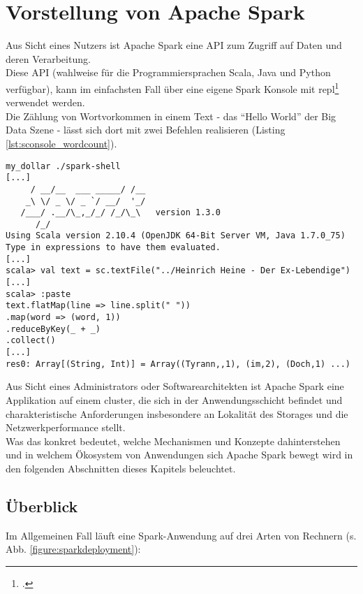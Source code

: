 \chapter{Vorstellung von Apache Spark}
Aus Sicht eines Nutzers ist Apache Spark eine API zum Zugriff auf Daten und deren Verarbeitung.\\

Diese API (wahlweise für die Programmiersprachen Scala, Java und Python verfügbar), kann im einfachsten Fall über eine eigene Spark Konsole mit \gls{repl}\footcite{Hail} verwendet werden.\\
Die Zählung von Wortvorkommen in einem Text - das "`Hello World"' der Big Data Szene - lässt sich dort mit zwei Befehlen realisieren (Listing \ref{lst:sconsole_wordcount}).\\

\begin{lstlisting}[caption={Word Count in der Spark Konsole},label={lst:sconsole_wordcount}]
my_dollar ./spark-shell
[...]
     / __/__  ___ _____/ /__
    _\ \/ _ \/ _ `/ __/  '_/
   /___/ .__/\_,_/_/ /_/\_\   version 1.3.0
      /_/
Using Scala version 2.10.4 (OpenJDK 64-Bit Server VM, Java 1.7.0_75)
Type in expressions to have them evaluated.
[...]
scala> val text = sc.textFile("../Heinrich Heine - Der Ex-Lebendige")
[...]
scala> :paste
text.flatMap(line => line.split(" "))
.map(word => (word, 1))
.reduceByKey(_ + _)
.collect()
[...]
res0: Array[(String, Int)] = Array((Tyrann,,1), (im,2), (Doch,1) ...)
\end{lstlisting}


Aus Sicht eines Administrators oder Softwarearchitekten ist Apache Spark eine Applikation auf einem \gls{cluster}, die sich in der Anwendungsschicht befindet und charakteristische Anforderungen insbesondere an Lokalität des Storages und die Netzwerkperformance stellt.\\

Was das konkret bedeutet, welche Mechanismen und Konzepte dahinterstehen und in welchem Ökosystem von Anwendungen sich Apache Spark bewegt wird in den folgenden Abschnitten dieses Kapitels beleuchtet.

\section{Überblick}
Im Allgemeinen Fall läuft eine Spark-Anwendung auf drei Arten von Rechnern (s. Abb. \ref{figure:sparkdeployment}):

